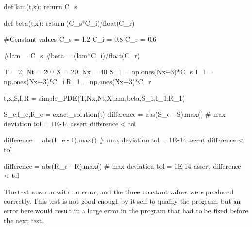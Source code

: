 \documentclass[%
twoside,                 %
final,                   %
10pt]{article}
\begin{document}
    def lam(t,x):
        return C_s

    def beta(t,x):
        return (C_s*C_i)/float(C_r)

    #Constant values
    C_s = 1.2
    C_i = 0.8
    C_r = 0.6
    
    #lam = C_s
    #beta = (lam*C_i)/float(C_r)
    
    T = 2; Nt = 200
    X = 20; Nx = 40
    S_1 = np.ones(Nx+3)*C_s
    I_1 = np.ones(Nx+3)*C_i
    R_1 = np.ones(Nx+3)*C_r
    
    t,x,S,I,R = simple_PDE(T,Nx,Nt,X,lam,beta,S_1,I_1,R_1)
    
    S_e,I_e,R_e = exact_solution(t)
    difference = abs(S_e - S).max()  # max deviation
    tol = 1E-14
    assert difference < tol

    difference = abs(I_e - I).max()  # max deviation
    tol = 1E-14
    assert difference < tol

    difference = abs(R_e - R).max()  # max deviation
    tol = 1E-14
    assert difference < tol
\epycod

The test was run with no error, and the three constant values were produced correctly. This test is not good enough by it self to qualify the program, but an error here would result in a large error in the program that had to be fixed before the next test. 
\end{document}
